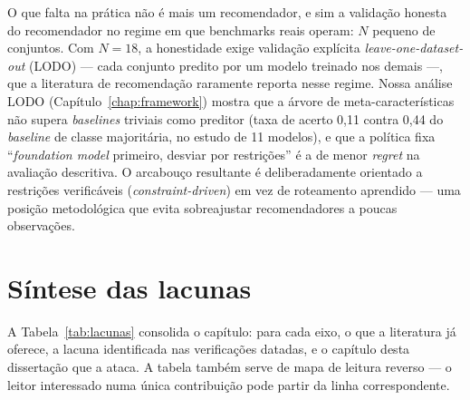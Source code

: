 O que falta na prática não é mais um recomendador, e
sim a validação honesta do recomendador no regime em que benchmarks reais
operam: $N$ pequeno de conjuntos. Com $N{=}18$, a honestidade exige
validação explícita \emph{leave-one-dataset-out} (LODO) --- cada conjunto
predito por um modelo treinado nos demais ---, que a literatura de
recomendação raramente reporta nesse regime. Nossa análise LODO
(Capítulo~\ref{chap:framework}) mostra que a árvore de meta-características
não supera \emph{baselines} triviais como preditor (taxa de acerto 0,11
contra 0,44 do \emph{baseline} de classe majoritária, no estudo de 11
modelos), e que a política fixa ``\emph{foundation model} primeiro,
desviar por restrições'' é a de menor \emph{regret} na avaliação
descritiva. O arcabouço resultante é
deliberadamente orientado a restrições verificáveis
(\emph{constraint-driven}) em vez de roteamento aprendido --- uma posição
metodológica que evita sobreajustar recomendadores a poucas
observações.

\section{Síntese das lacunas}
\label{sec:rel-sintese}

A Tabela~\ref{tab:lacunas} consolida o capítulo: para cada eixo, o que a
literatura já oferece, a lacuna identificada nas verificações datadas, e o
capítulo desta dissertação que a ataca. A tabela também serve de mapa de
leitura reverso --- o leitor interessado numa única contribuição pode
partir da linha correspondente.

